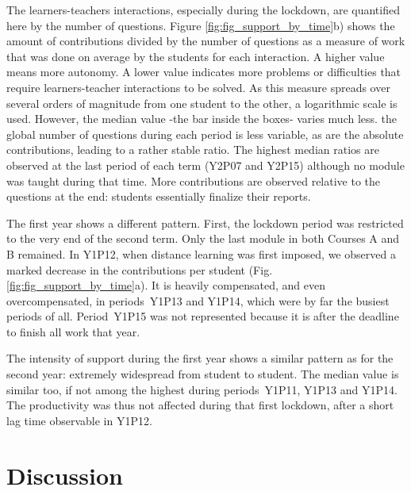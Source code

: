 \documentclass{aims} %
\theoremstyle{definition}
\begin{document}
The learners-teachers interactions, especially during the lockdown, are
quantified here by the number of questions. Figure
\ref {fig:fig_support_by_time}b) shows the amount of contributions
divided by the number of questions as a measure of work that was done on
average by the students for each interaction. A higher value means more
autonomy. A lower value indicates more problems or difficulties that
require learners-teacher interactions to be solved. As this measure
spreads over several orders of magnitude from one student to the other,
a logarithmic scale is used. However, the median value -the bar inside
the boxes- varies much less. the global number of questions during each
period is less variable, as are the absolute contributions, leading to a
rather stable ratio. The highest median ratios are observed at the last
period of each term (Y2P07 and Y2P15) although no module was taught
during that time. More contributions are observed relative to the
questions at the end: students essentially finalize their reports.

The first year shows a different pattern. First, the lockdown period was
restricted to the very end of the second term. Only the last module in
both Courses A and B remained. In Y1P12, when distance learning was
first imposed, we observed a marked decrease in the contributions per
student (Fig. \ref {fig:fig_support_by_time}a). It is heavily
compensated, and even overcompensated, in periods~Y1P13 and Y1P14, which
were by far the busiest periods of all. Period~Y1P15 was not represented
because it is after the deadline to finish all work that year.

The intensity of support during the first year shows a similar pattern
as for the second year: extremely widespread from student to student.
The median value is similar too, if not among the highest during
periods~Y1P11, Y1P13 and Y1P14. The productivity was thus not affected
during that first lockdown, after a short lag time observable in Y1P12.

\hypertarget{discussion}{%
\section{Discussion}\label{discussion}}
\end{document}
